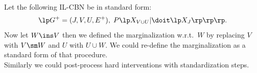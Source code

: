 \begin{Rem}
    Let the following IL-CBN be in standard form:    
    \[ \lp G^+=(J,V,U,E^+), \; P\lp X_{V \cup U}| \doit\lp X_{J} \rp\rp \rp.\]
    Now let $W \ins V$ then we defined the marginalization w.r.t.\ $W$ by replacing $V$ with $V \sm W$ and $U$ with $U \cup W$.
    We could re-define the marginalization as a standard form of that procedure.\\
    Similarly we could post-process hard interventions with standardization steps.
\end{Rem}


%


